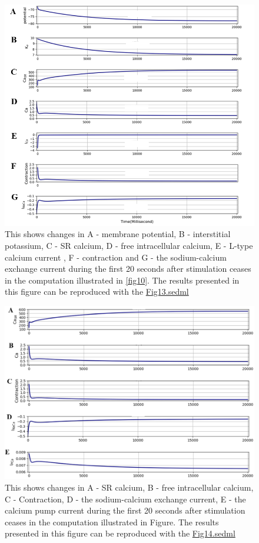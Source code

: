 \documentclass[fleqn,10pt]{physiome}
\begin{document}
\begin{figure}[h!]
\centering
\includegraphics[width=0.7\linewidth]{figure12}
\caption{This shows changes in A - membrane potential, B - interstitial potassium, C - SR calcium, D - free intracellular calcium, E - L-type calcium current , F - contraction and G - the sodium-calcium exchange current during the first 20 seconds after stimulation ceases in the computation illustrated in \autoref{fig10}. The results presented in this figure can be reproduced with the \href{https://models.physiomeproject.org/workspace/5f4/file/26289d9227fbf4f66ca8106d8bf80ff9a51a5ac6/Fig13.sedml}{Fig13.sedml}}
\label{fig12}
\end{figure}

\begin{figure}[h!]
\centering
\includegraphics[width=0.8\linewidth]{figure13}
\caption{This shows changes in A - SR calcium, B - free intracellular calcium, C - Contraction, D - the sodium-calcium exchange current, E - the calcium pump current during the first 20 seconds after stimulation ceases in the computation illustrated in Figure. The results presented in this figure can be reproduced with the \href{https://models.physiomeproject.org/workspace/5f4/file/26289d9227fbf4f66ca8106d8bf80ff9a51a5ac6/Fig14.sedml}{Fig14.sedml}}\newpage
\label{fig13}
\end{figure}
\end{document}
